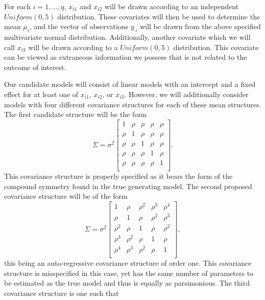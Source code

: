 		For each $i = 1,...,q$, $x_{i1}$ and $x_{i2}$ will be drawn according to an independent $Uniform(0,5)$ distribution. These covariates will then be used to determine the mean
		$\mu_i$, and the vector of observations $y_{\cdot i}$ will be drawn from the above specified multivariate normal distribution. Additionally, another covariate which we will
		call $x_{i3}$ will be drawn according to a $Uniform(0,5)$ distribution. This covariate can be viewed as extraneous information we possess that is not related to the outcome of
		interest. 

		Our candidate models will consist of linear models with an intercept and a fixed effect for at least one of $x_{i1}$, $x_{i2}$, or $x_{i3}$. However, we will additionally consider models
		with four different covariance structures for each of these mean structures. The first candidate structure will be the form
		\begin{equation*}
			\Sigma = \sigma^2
			\begin{bmatrix}
				1 & \rho & \rho & \rho & \rho \\
				\rho & 1 & \rho & \rho & \rho \\
				\rho & \rho & 1 & \rho & \rho \\
				\rho & \rho & \rho & 1 & \rho \\
				\rho & \rho & \rho & \rho & 1 \\
			\end{bmatrix}
			.
		\end{equation*}
		This covariance structure is properly specified as it bears the form of the compound symmetry found in the true generating model. The second proposed covariance structure will be
		of the form
		\begin{equation*}
			\Sigma = \sigma^2
			\begin{bmatrix}
				1 & \rho & \rho^2 & \rho^3 & \rho^4 \\
				\rho & 1 & \rho & \rho^2 & \rho^3 \\
				\rho^2 & \rho & 1 & \rho & \rho^2 \\
				\rho^3 & \rho^2 & \rho & 1 & \rho \\
				\rho^4 & \rho^3 & \rho^2 & \rho & 1 \\
			\end{bmatrix}
			,
		\end{equation*}
		this being an auto-regressive covariance structure of order one. This covariance structure is misspecified in this case, yet has the same number of parameters to be estimated as the
		true model and thus is equally as parsimonious. The third covariance structure is one such that 

